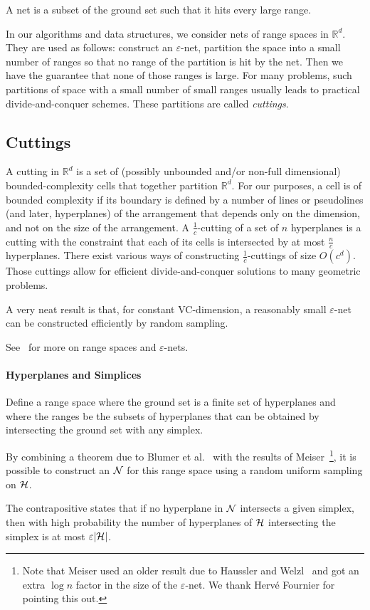 A net is a subset of the ground set such that it hits every large range.
%

%
In our algorithms and data structures,
%
we consider nets of range spaces in \(\mathbb{R}^d\).
They are used as follows: construct an \(\varepsilon\)-net,
partition the space into a small number of ranges so that no range of the
partition is hit by the net. Then we have the guarantee that none of those
ranges is large.
%
For many problems,
such partitions of space with a small number of
small ranges usually leads to practical divide-and-conquer schemes.
These partitions are called \emph{cuttings}.

\subsection{Cuttings}%
\label{sec:divide-and-conquer:cuttings}

A cutting in \(\mathbb{R}^d\)
is a set of (possibly unbounded and/or non-full dimensional)
bounded-complexity cells that together partition \(\mathbb{R}^{d}\).
%
For our purposes, a cell is of bounded complexity if its boundary is defined by
a number of lines or pseudolines (and later, hyperplanes) of the arrangement
that depends only on the dimension, and not on the size of the arrangement.
%
A \(\frac{1}{c}\)-cutting of a set of \(n\) hyperplanes is a cutting with the
constraint that each of its cells is intersected by at most \(\frac{n}{c}\)
hyperplanes. There exist various ways of constructing \(\frac{1}{c}\)-cuttings of
size \(O(c^d)\).
Those cuttings allow for efficient divide-and-conquer
solutions to many geometric problems.


A very neat result is that, for constant VC-dimension, a reasonably small
\(\varepsilon\)-net can be constructed efficiently by random sampling.


See~\cite[Section~40.4]{CMR04} for more on
range spaces and \(\varepsilon\)-nets.

\paragraph{Hyperplanes and Simplices}

Define a range space where the ground set is a finite set of hyperplanes and
where the ranges be the subsets of hyperplanes that can be obtained by
intersecting the ground set with any simplex.

By combining a theorem due to Blumer et
al.~\cite{BEHW89} with the results of Meiser~\cite{M93}\footnote{Note that
Meiser used an older result due to Haussler and Welzl~\cite{H87} and got an
extra $\log n$ factor in the size of the $\varepsilon$-net. We thank Hervé
Fournier for pointing this out.}, it is possible to
construct an \enet{} \(\mathcal{N}\) for this range space
using a random uniform sampling on \(\mathcal{H}\).
%

%
The contrapositive states that if no hyperplane in \(\mathcal{N}\) intersects
a given simplex, then with high probability the number of hyperplanes of
\(\mathcal{H}\) intersecting the simplex is at most \(\varepsilon |{\mathcal{H}}|\).

